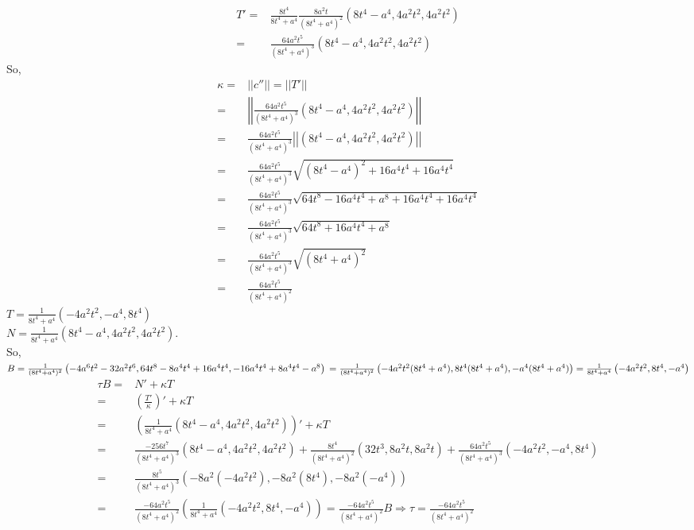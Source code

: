 \documentclass[12pt]{amsart}
\begin{document}
\begin{align*}
	T'=&\frac{8t^4}{8t^4+a^4}\frac{8a^2t}{(8t^4+a^4)^2}\left(8t^4-a^4,4a^2t^2,4a^2t^2\right)
	\\=&\frac{64a^2t^5}{(8t^4+a^4)^3}\left(8t^4-a^4,4a^2t^2,4a^2t^2\right)
\end{align*}
So,
\begin{align*}
	\kappa=&||c''||=||T'||
	\\=&\left|\left|\frac{64a^2t^5}{(8t^4+a^4)^3}\left(8t^4-a^4,4a^2t^2,4a^2t^2\right)\right|\right|
	\\=&\frac{64a^2t^5}{(8t^4+a^4)^3}\left|\left|\left(8t^4-a^4,4a^2t^2,4a^2t^2\right)\right|\right|
	\\=&\frac{64a^2t^5}{(8t^4+a^4)^3}\sqrt{(8t^4-a^4)^2+16a^4t^4+16a^4t^4}
	\\=&\frac{64a^2t^5}{(8t^4+a^4)^3}\sqrt{64t^8-16a^4t^4+a^8+16a^4t^4+16a^4t^4}
	\\=&\frac{64a^2t^5}{(8t^4+a^4)^3}\sqrt{64t^8+16a^4t^4+a^8}
	\\=&\frac{64a^2t^5}{(8t^4+a^4)^3}\sqrt{(8t^4+a^4)^2}
	\\=&\frac{64a^2t^5}{(8t^4+a^4)^2}
\end{align*}
$T=\frac{1}{8t^4+a^4}\left(-4a^2t^2,-a^4,8t^4\right)$
\\$N=\frac{1}{8t^4+a^4}\left(8t^4-a^4,4a^2t^2,4a^2t^2\right)$.
\\So, $B=\frac{1}{(8t^4+a^4)^2}\left(-4a^6t^2-32a^2t^6,64t^8-8a^4t^4+16a^4t^4,-16a^4t^4+8a^4t^4-a^8\right)
\\=\frac{1}{(8t^4+a^4)^2}\left(-4a^2t^2(8t^4+a^4),8t^4(8t^4+a^4),-a^4(8t^4+a^4)\right)=\frac{1}{8t^4+a^4}\left(-4a^2t^2,8t^4,-a^4\right)$
\begin{align*}
	\tau B=&N'+\kappa T
	\\=&\left(\frac{T'}{\kappa}\right)'+\kappa T
	\\=&\left(\frac{1}{8t^4+a^4}\left(8t^4-a^4,4a^2t^2,4a^2t^2\right)\right)'+\kappa T
	\\=&\frac{-256t^7}{(8t^4+a^4)^3}\left(8t^4-a^4,4a^2t^2,4a^2t^2\right)+\frac{8t^4}{(8t^4+a^4)^2}\left(32t^3,8a^2t,8a^2t\right)+\frac{64a^2t^5}{(8t^4+a^4)^3}\left(-4a^2t^2,-a^4,8t^4\right)
	\\ =&\frac{8t^5}{(8t^4+a^4)^3}\left(-8a^2(-4a^2t^2),-8a^2(8t^4),-8a^2(-a^4) \right)
	\\=&\frac{-64a^2t^5}{(8t^4+a^4)^2}\left(\frac{1}{8t^4+a^4}\left(-4a^2t^2,8t^4,-a^4 \right)\right)=\frac{-64a^2t^5}{(8t^4+a^4)^2}B\Rightarrow\tau=\frac{-64a^2t^5}{(8t^4+a^4)^2}
\end{align*}
\end{document}
